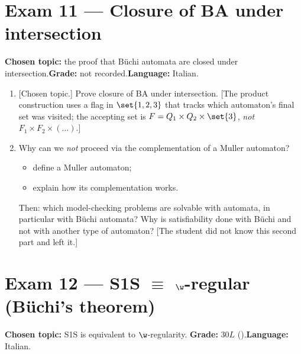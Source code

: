 \documentclass[oneside]{academica}
\begin{document}
\section{Exam 11 --- Closure of BA under intersection}
\textbf{Chosen topic:} the proof that Büchi automata are closed under
intersection.\quad\textbf{Grade:} not recorded.\quad\textbf{Language:}
Italian.

\begin{enumerate}
  \item {}[Chosen topic.] Prove closure of BA under intersection. [The
    product construction uses a flag in $\set{1,2,3}$ that tracks which
    automaton's final set was visited; the accepting set is
    $F = Q_1\times Q_2\times\set{3}$, \emph{not}
    $F_1\times F_2\times(\dots)$.]
  \item Why can we \emph{not} proceed via the complementation of a Muller
    automaton?
    \begin{itemize}
      \item define a Muller automaton;
      \item explain how its complementation works.
    \end{itemize}
    Then: which model-checking problems are solvable with automata, in
    particular with Büchi automata? Why is satisfiability done with
    Büchi and not with another type of automaton? [The student did not
    know this second part and left it.]
\end{enumerate}

\section{Exam 12 --- S1S \texorpdfstring{$\equiv$}{=} \texorpdfstring{$\w$}{omega}-regular (Büchi's theorem)}
\textbf{Chosen topic:} S1S is equivalent to $\w$-regularity.\quad
\textbf{Grade:} $30L$ ().\quad\textbf{Language:}
Italian.
\end{document}
